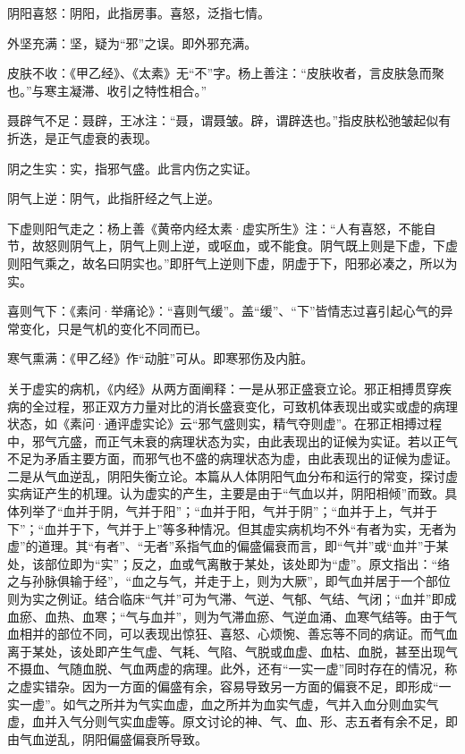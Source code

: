 \documentclass[draft,12pt]{ctexbook}
\begin{document}
\begin{jiaozhu}
  \item 阴阳喜怒：阴阳，此指房事。喜怒，泛指七情。
  \item 外坚充满：坚，疑为“邪”之误。即外邪充满。
  \item 皮肤不收：《甲乙经》、《太素》无“不”字。杨上善注：“皮肤收者，言皮肤急而聚也。”与寒主凝滞、收引之特性相合。”
  \item 聂辟气不足：聂辟，王冰注：“聂，谓聂皱。辟，谓辟迭也。”指皮肤松弛皱起似有折迭，是正气虚衰的表现。
  \item 阴之生实：实，指邪气盛。此言内伤之实证。
  \item 阴气上逆：阴气，此指肝经之气上逆。
  \item 下虚则阳气走之：杨上善《黄帝内经太素·虚实所生》注：“人有喜怒，不能自节，故怒则阴气上，阴气上则上逆，或呕血，或不能食。阴气既上则是下虚，下虚则阳气乘之，故名曰阴实也。”即肝气上逆则下虚，阴虚于下，阳邪必凑之，所以为实。
  \item 喜则气下：《素问·举痛论》：“喜则气缓”。盖“缓”、“下”皆情志过喜引起心气的异常变化，只是气机的变化不同而已。
  \item 寒气熏满：《甲乙经》作“动脏”可从。即寒邪伤及内脏。
\end{jiaozhu}



关于虚实的病机，《内经》从两方面阐释：一是从邪正盛衰立论。邪正相搏贯穿疾病的全过程，邪正双方力量对比的消长盛衰变化，可致机体表现出或实或虚的病理状态，如《素问·通评虚实论》云“邪气盛则实，精气夺则虚”。在邪正相搏过程中，邪气亢盛，而正气未衰的病理状态为实，由此表现出的证候为实证。若以正气不足为矛盾主要方面，而邪气也不盛的病理状态为虚，由此表现出的证候为虚证。二是从气血逆乱，阴阳失衡立论。本篇从人体阴阳气血分布和运行的常变，探讨虚实病证产生的机理。认为虚实的产生，主要是由于“气血以并，阴阳相倾”而致。具体列举了“血并于阴，气并于阳”；“血并于阳，气并于阴”；“血并于上，气并于下”；“血并于下，气并于上”等多种情况。但其虚实病机均不外“有者为实，无者为虚”的道理。其“有者”、“无者”系指气血的偏盛偏衰而言，即“气并”或“血并”于某处，该部位即为“实”；反之，血或气离散于某处，该处即为“虚”。原文指出：“络之与孙脉俱输于经”，“血之与气，并走于上，则为大厥”，即气血并居于一个部位则为实之例证。结合临床“气并”可为气滞、气逆、气郁、气结、气闭；“血并”即成血瘀、血热、血寒；“气与血并”，则为气滞血瘀、气逆血涌、血寒气结等。由于气血相并的部位不同，可以表现出惊狂、喜怒、心烦惋、善忘等不同的病证。而气血离于某处，该处即产生气虚、气耗、气陷、气脱或血虚、血枯、血脱，甚至出现气不摄血、气随血脱、气血两虚的病理。此外，还有“一实一虚”同时存在的情况，称之虚实错杂。因为一方面的偏盛有余，容易导致另一方面的偏衰不足，即形成“一实一虚”。如气之所并为气实血虚，血之所并为血实气虚，气并入血分则血实气虚，血并入气分则气实血虚等。原文讨论的神、气、血、形、志五者有余不足，即由气血逆乱，阴阳偏盛偏衰所导致。
\end{document}
